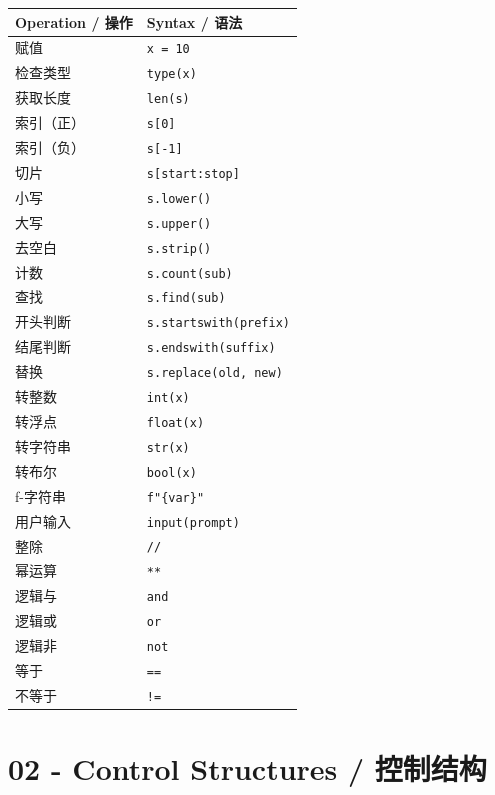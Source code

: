 \documentclass[11pt,a4paper]{report}
\let\oldtexttt\texttt
\renewcommand{\texttt}[1]{\textcolor{mainblue}{\oldtexttt{#1}}}
\begin{document}
\medskip
\centering
\small
\renewcommand{\arraystretch}{1.3}
\begin{tabular}{@{}ll@{}}
\toprule
\textbf{Operation / 操作} & \textbf{Syntax / 语法} \\ \midrule
赋值 & \texttt{x = 10} \\
检查类型 & \texttt{type(x)} \\
获取长度 & \texttt{len(s)} \\
索引（正） & \texttt{s[0]} \\
索引（负） & \texttt{s[-1]} \\
切片 & \texttt{s[start:stop]} \\
小写 & \texttt{s.lower()} \\
大写 & \texttt{s.upper()} \\
去空白 & \texttt{s.strip()} \\
计数 & \texttt{s.count(sub)} \\
查找 & \texttt{s.find(sub)} \\
开头判断 & \texttt{s.startswith(prefix)} \\
结尾判断 & \texttt{s.endswith(suffix)} \\
替换 & \texttt{s.replace(old, new)} \\
转整数 & \texttt{int(x)} \\
转浮点 & \texttt{float(x)} \\
转字符串 & \texttt{str(x)} \\
转布尔 & \texttt{bool(x)} \\
f-字符串 & \texttt{f"\{var\}"} \\
用户输入 & \texttt{input(prompt)} \\
整除 & \texttt{//} \\
幂运算 & \texttt{**} \\
逻辑与 & \texttt{and} \\
逻辑或 & \texttt{or} \\
逻辑非 & \texttt{not} \\
等于 & \texttt{==} \\
不等于 & \texttt{!=} \\ \bottomrule
\end{tabular}
\medskip



\chapter{02 - Control Structures / 控制结构}
\end{document}
